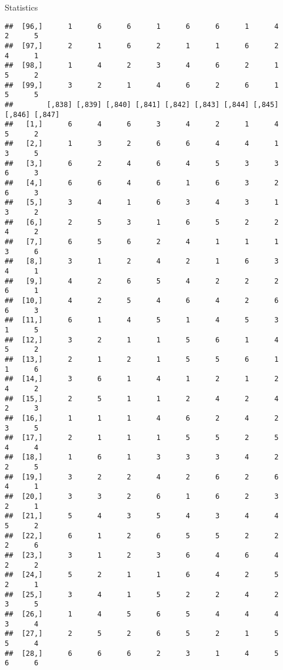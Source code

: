 \documentclass[
  ignorenonframetext,
]{beamer}
\begin{document}
\begin{frame}[fragile]{Statistics}
\begin{verbatim}
##  [96,]      1      6      6      1      6      6      1      4      2      5
##  [97,]      2      1      6      2      1      1      6      2      4      1
##  [98,]      1      4      2      3      4      6      2      1      5      2
##  [99,]      3      2      1      4      6      2      6      1      5      5
##        [,838] [,839] [,840] [,841] [,842] [,843] [,844] [,845] [,846] [,847]
##   [1,]      6      4      6      3      4      2      1      4      5      2
##   [2,]      1      3      2      6      6      4      4      1      3      5
##   [3,]      6      2      4      6      4      5      3      3      6      3
##   [4,]      6      6      4      6      1      6      3      2      6      3
##   [5,]      3      4      1      6      3      4      3      1      3      2
##   [6,]      2      5      3      1      6      5      2      2      4      2
##   [7,]      6      5      6      2      4      1      1      1      3      6
##   [8,]      3      1      2      4      2      1      6      3      4      1
##   [9,]      4      2      6      5      4      2      2      2      6      1
##  [10,]      4      2      5      4      6      4      2      6      6      3
##  [11,]      6      1      4      5      1      4      5      3      1      5
##  [12,]      3      2      1      1      5      6      1      4      5      2
##  [13,]      2      1      2      1      5      5      6      1      1      6
##  [14,]      3      6      1      4      1      2      1      2      4      2
##  [15,]      2      5      1      1      2      4      2      4      2      3
##  [16,]      1      1      1      4      6      2      4      2      3      5
##  [17,]      2      1      1      1      5      5      2      5      4      4
##  [18,]      1      6      1      3      3      3      4      2      2      5
##  [19,]      3      2      2      4      2      6      2      6      4      1
##  [20,]      3      3      2      6      1      6      2      3      2      1
##  [21,]      5      4      3      5      4      3      4      4      5      2
##  [22,]      6      1      2      6      5      5      2      2      2      6
##  [23,]      3      1      2      3      6      4      6      4      2      2
##  [24,]      5      2      1      1      6      4      2      5      2      1
##  [25,]      3      4      1      5      2      2      4      2      3      5
##  [26,]      1      4      5      6      5      4      4      4      3      4
##  [27,]      2      5      2      6      5      2      1      5      5      4
##  [28,]      6      6      6      2      3      1      4      5      6      6

\end{verbatim}
\end{frame}
\end{document}
